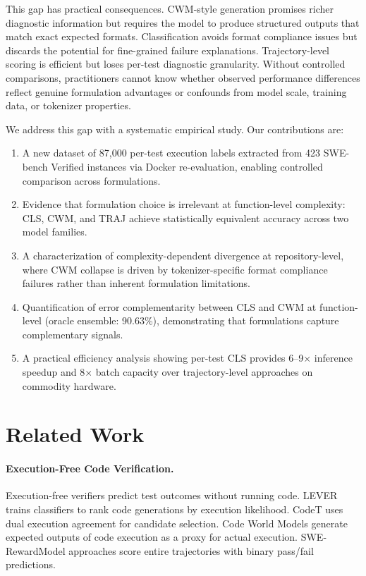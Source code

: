 \documentclass[11pt]{article}
\begin{document}
This gap has practical consequences. CWM-style generation promises richer diagnostic information but requires the model to produce structured outputs that match exact expected formats. Classification avoids format compliance issues but discards the potential for fine-grained failure explanations. Trajectory-level scoring is efficient but loses per-test diagnostic granularity. Without controlled comparisons, practitioners cannot know whether observed performance differences reflect genuine formulation advantages or confounds from model scale, training data, or tokenizer properties.

We address this gap with a systematic empirical study. Our contributions are:
\begin{enumerate}
\item A new dataset of 87,000 per-test execution labels extracted from 423 SWE-bench Verified instances via Docker re-evaluation, enabling controlled comparison across formulations.
\item Evidence that formulation choice is irrelevant at function-level complexity: CLS, CWM, and TRAJ achieve statistically equivalent accuracy across two model families.
\item A characterization of complexity-dependent divergence at repository-level, where CWM collapse is driven by tokenizer-specific format compliance failures rather than inherent formulation limitations.
\item Quantification of error complementarity between CLS and CWM at function-level (oracle ensemble: 90.63\%), demonstrating that formulations capture complementary signals.
\item A practical efficiency analysis showing per-test CLS provides 6--9$\times$ inference speedup and 8$\times$ batch capacity over trajectory-level approaches on commodity hardware.
\end{enumerate}

\section{Related Work}

\paragraph{Execution-Free Code Verification.}
Execution-free verifiers predict test outcomes without running code. LEVER \citep{ni2023lever} trains classifiers to rank code generations by execution likelihood. CodeT \citep{chen2023codet} uses dual execution agreement for candidate selection. Code World Models \citep{ding2024codeworldmodels} generate expected outputs of code execution as a proxy for actual execution. SWE-RewardModel approaches \citep{zhang2025swebench} score entire trajectories with binary pass/fail predictions.
\end{document}
